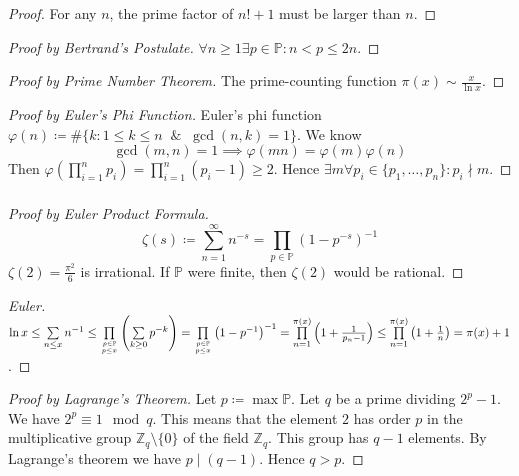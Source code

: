 \documentclass[UTF8,11pt,colorlinks,compress,openany]{beamer}%
\begin{document}
\begin{frame}\frametitle{}
\begin{proof}
For any $n$, the prime factor of $n!+1$ must be larger than $n$.
\end{proof}
\begin{proof}[Proof by Bertrand's Postulate]
$\forall n\geq 1\exists p\in\mathbb{P}: n<p\leq 2n$.
\end{proof}
\begin{proof}[Proof by Prime Number Theorem]
The prime-counting function $\pi(x)\sim\frac{x}{\ln x}$.
\end{proof}
\begin{proof}[Proof by Euler's Phi Function]
Euler's phi function $\varphi(n)\coloneqq \#\{k: 1\leq k\leq n\;\;\&\;\;\gcd(n,k)=1\}$. We know
\[\gcd(m,n)=1\implies\varphi(mn)=\varphi(m)\varphi(n)\]
Then $\varphi\left(\prod\limits_{i=1}^n p_i\right)=\prod\limits_{i=1}^n(p_i-1)\geq 2$. Hence $\exists m\forall p_i\in\{p_1,\dots,p_n\}: p_i\nmid m$.
\end{proof}
\end{frame}

\begin{frame}\frametitle{}
\begin{proof}[Proof by Euler Product Formula]
\[\zeta(s)\coloneqq \sum\limits_{n=1}^\infty n^{-s}=\prod\limits_{p\in\mathbb{P}}\left(1-p^{-s}\right)^{-1}\]
$\zeta(2)=\frac{\pi^2}{6}$ is irrational. If $\mathbb{P}$ were finite, then $\zeta(2)$ would be rational.
\end{proof}
\begin{proof}[Euler]
$\ln x\leq\sum\limits_{n\leq x} n^{-1}\leq \prod\limits_{p\in\mathbb{P}\atop{p\leq x}}\left(\sum\limits_{k\geq 0}p^{-k}\right)=\prod\limits_{p\in\mathbb{P}\atop{p\leq x}}\left(1-p^{-1}\right)^{-1}=\prod\limits_{n=1}^{\pi(x)}\left(1+\frac{1}{p_n-1}\right)\leq \prod\limits_{n=1}^{\pi(x)}\left(1+\frac{1}{n}\right)=\pi(x)+1$.
\end{proof}
\begin{proof}[Proof by Lagrange's Theorem]
Let $p\coloneqq \max\mathbb{P}$. Let $q$ be a prime dividing $2^p-1$. We have $2^p\equiv 1 \mod q$. This means that the element $2$ has order $p$ in the multiplicative group $\mathbb{Z}_q\setminus\{0\}$ of the field $\mathbb{Z}_q$. This group has $q-1$ elements. By Lagrange's theorem we have $p\mid(q-1)$. Hence $q>p$.
\end{proof}
\end{frame}
\end{document}

